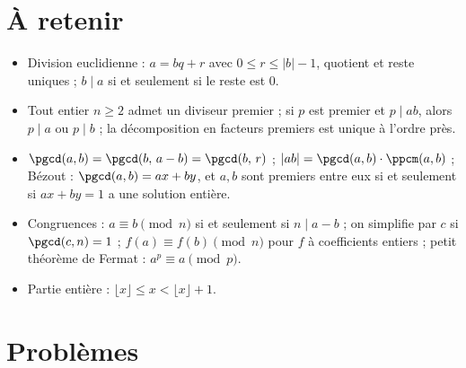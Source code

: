 \documentclass[11pt]{article}
\begin{document}

\section{À retenir}\label{sec:retenir}

\begin{retenir}
\begin{itemize}
	\item Division euclidienne : $a = bq + r$ avec $0 \leq r \leq |b| - 1$, quotient et reste uniques ; $b \mid a$ si et seulement si le reste est $0$.
	\item Tout entier $n \geq 2$ admet un diviseur premier ; si $p$ est premier et $p \mid ab$, alors $p \mid a$ ou $p \mid b$ ; la décomposition en facteurs premiers est unique à l'ordre près.
	\item $\pgcd(a,b) = \pgcd(b,\, a-b) = \pgcd(b,\, r)$ ; $|ab| = \pgcd(a,b) \cdot \ppcm(a,b)$ ; Bézout : $\pgcd(a,b) = ax+by$, et $a, b$ sont premiers entre eux si et seulement si $ax+by=1$ a une solution entière.
	\item Congruences : $a \equiv b \pmod n$ si et seulement si $n \mid a-b$ ; on simplifie par $c$ si $\pgcd(c,n)=1$ ; $f(a) \equiv f(b) \pmod n$ pour $f$ à coefficients entiers ; petit théorème de Fermat : $a^p \equiv a \pmod p$.
	\item Partie entière : $\lfloor x \rfloor \leq x < \lfloor x \rfloor + 1$.
\end{itemize}
\end{retenir}

\section{Problèmes}\label{sec:problemes}




\end{document}
